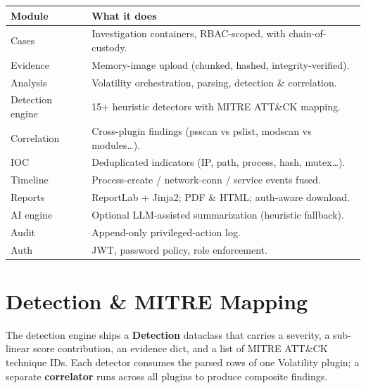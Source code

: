 \documentclass[11pt,a4paper]{article}
\begin{document}
\begin{longtable}{p{3.5cm} p{12.0cm}}
\toprule
\textbf{Module} & \textbf{What it does} \\
\midrule
Cases             & Investigation containers, RBAC-scoped, with chain-of-custody. \\
Evidence          & Memory-image upload (chunked, hashed, integrity-verified). \\
Analysis          & Volatility orchestration, parsing, detection \& correlation. \\
Detection engine  & 15+ heuristic detectors with MITRE ATT\&CK mapping. \\
Correlation       & Cross-plugin findings (psscan vs pslist, modscan vs modules\dots). \\
IOC               & Deduplicated indicators (IP, path, process, hash, mutex\dots). \\
Timeline          & Process-create / network-conn / service events fused. \\
Reports           & ReportLab + Jinja2; PDF \& HTML; auth-aware download. \\
AI engine         & Optional LLM-assisted summarization (heuristic fallback). \\
Audit             & Append-only privileged-action log. \\
Auth              & JWT, password policy, role enforcement. \\
\bottomrule
\end{longtable}

\section{Detection \& MITRE Mapping}

The detection engine ships a \textbf{Detection} dataclass that carries a
severity, a sub-linear score contribution, an evidence dict, and a list of
MITRE ATT\&CK technique IDs. Each detector consumes the parsed rows of one
Volatility plugin; a separate \textbf{correlator} runs across all plugins to
produce composite findings.
\end{document}
